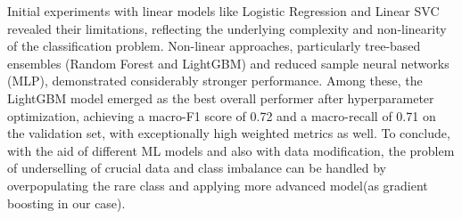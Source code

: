 \documentclass[a4paper,12pt]{article}
\begin{document}
Initial experiments with linear models like Logistic Regression and Linear SVC revealed their limitations, reflecting the underlying complexity and non-linearity of the classification problem. Non-linear approaches, particularly tree-based ensembles (Random Forest and LightGBM) and reduced sample neural networks (MLP), demonstrated considerably stronger performance. Among these, the LightGBM model emerged as the best overall performer after hyperparameter optimization, achieving a macro-F1 score of 0.72 and a macro-recall of 0.71 on the validation set, with exceptionally high weighted metrics as well.
To conclude, with the aid of different ML models and also with data modification, the problem of underselling of crucial data and class imbalance can be handled by overpopulating the rare class and applying more advanced model(as gradient boosting in our case).
\end{document}
